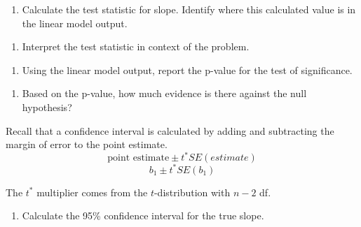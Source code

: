 \documentclass[
]{report}
\newenvironment{Shaded}{\begin{snugshade}}{\end{snugshade}}
\newcommand{\CommentTok}[1]{\textcolor[rgb]{0.56,0.35,0.01}{\textit{#1}}}
\newcommand{\DecValTok}[1]{\textcolor[rgb]{0.00,0.00,0.81}{#1}}
\newcommand{\FloatTok}[1]{\textcolor[rgb]{0.00,0.00,0.81}{#1}}
\newcommand{\KeywordTok}[1]{\textcolor[rgb]{0.13,0.29,0.53}{\textbf{#1}}}
\newcommand{\NormalTok}[1]{#1}
\providecommand{\tightlist}{%
  \setlength{\itemsep}{0pt}\setlength{\parskip}{0pt}}
\begin{document}
\begin{enumerate}
\def\labelenumi{\arabic{enumi}.}
\setcounter{enumi}{11}
\tightlist
\item
  Calculate the test statistic for slope. Identify where this calculated value is in the linear model output.
\end{enumerate}

\vspace{1in}

\begin{enumerate}
\def\labelenumi{\arabic{enumi}.}
\setcounter{enumi}{12}
\tightlist
\item
  Interpret the test statistic in context of the problem.
\end{enumerate}

\vspace{1in}

\begin{enumerate}
\def\labelenumi{\arabic{enumi}.}
\setcounter{enumi}{13}
\tightlist
\item
  Using the linear model output, report the p-value for the test of significance.
\end{enumerate}

\vspace{0.5in}

\begin{enumerate}
\def\labelenumi{\arabic{enumi}.}
\setcounter{enumi}{14}
\tightlist
\item
  Based on the p-value, how much evidence is there against the null hypothesis?
\end{enumerate}

\vspace{0.5in}

Recall that a confidence interval is calculated by adding and subtracting the margin of error to the point estimate.\\
\[\mbox{point estimate}\pm t^*SE(estimate)\]
\[b_1 \pm t^* SE(b_1)\]

The \(t^*\) multiplier comes from the \(t\)-distribution with \(n-2\) df.

\begin{Shaded}
\end{Shaded}

\begin{enumerate}
\def\labelenumi{\arabic{enumi}.}
\setcounter{enumi}{15}
\tightlist
\item
  Calculate the 95\% confidence interval for the true slope.
  \vspace{1in}
\end{enumerate}
\end{document}
